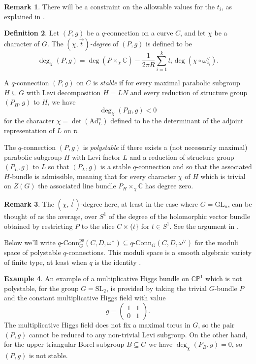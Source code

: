 \documentclass[11pt, oneside, reqno]{amsart}
\theoremstyle{definition} \newtheorem{definition}{Definition}[section]
\theoremstyle{definition} \newtheorem{remark}[definition]{Remark}
\theoremstyle{definition} \newtheorem{remarks}[definition]{Remarks}
\theoremstyle{definition} \newtheorem{question}[definition]{Question}
\theoremstyle{definition} \newtheorem*{note}{Note}
\theoremstyle{definition} \newtheorem{example}[definition]{Example}
\theoremstyle{definition} \newtheorem{examples}[definition]{Examples}
\newcommand{\bb}[1]{\mathbb{#1}}
\newcommand{\mr}[1]{\mathrm{#1}}
\newcommand{\mf}[1]{\mathfrak{#1}}
\newcommand{\CC}{\mathbb{C}}
\newcommand{\SL}{\mathrm{SL}}
\newcommand{\GL}{\mathrm{GL}}
\newcommand{\sub}{\subseteq}
\newcommand{\qconn}{q\text{-Conn}}
\begin{document}
\begin{remark} \label{t_stability_remark}
There will be a constraint on the allowable values for the $t_i$, as explained in \cite[Section 3.2]{CharbonneauHurtubise}. 
\end{remark}

\begin{definition} \label{polystable_def}
Let $(P,g)$ be a $q$-connection on a curve $C$, and let $\chi$ be a character of $G$.  The \emph{$(\chi, \overrightarrow{t})$-degree} of $(P,g)$ is defined to be 
\[\deg_\chi(P,g) = \deg(P \times_\chi \CC) - \frac 1{2\pi R} \sum_{i=1}^k t_i\deg(\chi \circ \omega^\vee_{z_i}).\]

A $q$-connection $(P,g)$ on $C$ is \emph{stable} if for every maximal parabolic subgroup $H \sub G$ with Levi decomposition $H = LN$ and every reduction of structure group $(P_H, g)$ to $H$, we have
\[\deg_\chi(P_H, g) < 0\]
for the character $\chi = \det(\mr{Ad}_L^{\mf n})$ defined to be the determinant of the adjoint representation of $L$ on $\mf n$.

The $q$-connection $(P,g)$ is \emph{polystable} if there exists a (not necessarily maximal) parabolic subgroup $H$ with Levi factor $L$ and a reduction of structure group $(P_L, g)$ to $L$ so that $(P_L,g)$ is a stable $q$-connection and so that the associated $H$-bundle is admissible, meaning that for every character $\chi$ of $H$ which is trivial on $Z(G)$ the associated line bundle $P_H \times_\chi \CC$ has degree zero. 
\end{definition}

\begin{remark}
The $(\chi, \overrightarrow{t})$-degree here, at least in the case where $G = \GL_n$, can be thought of as the average, over $S^1$ of the degree of the holomorphic vector bundle obtained by restricting $P$ to the slice $C \times \{t\}$ for $t \in S^1$.  See the argument in \cite[Lemma 4.5]{CharbonneauHurtubise}. 
\end{remark}

Below we'll write $\qconn_G^{\text{ps}}(C, D, \omega^\vee) \sub \qconn_G(C,D,\omega^\vee)$ for the moduli space of polystable $q$-connections.  This moduli space is a smooth algebraic variety of finite type, at least when $q$ is the identity \cite{CharbonneauHurtubise,Smith}.  

\begin{example}
An example of a multiplicative Higgs bundle on $\bb{CP}^1$ which is not polystable, for the group $G = \SL_2$, is provided by taking the trivial $G$-bundle $P$ and the constant multiplicative Higgs field with value \[g = \begin{pmatrix}1&1\\0&1\end{pmatrix}.\]  The multiplicative Higgs field does not fix a maximal torus in $G$, so the pair $(P,g)$ cannot be reduced to any non-trivial Levi subgroup.  On the other hand, for the upper triangular Borel subgroup $B \sub G$ we have $\deg_\chi(P_B, g) = 0$, so $(P,g)$ is not stable.
\end{example}
\end{document}
